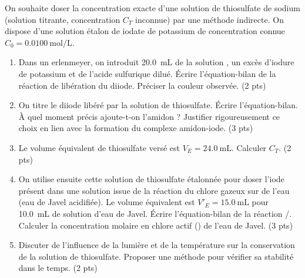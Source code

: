 \documentclass[11pt]{article}
\begin{document}
\begin{exercice}
On souhaite doser la concentration exacte d'une solution de thiosulfate de sodium  (solution titrante, concentration $C_T$ inconnue) par une méthode indirecte. On dispose d'une solution étalon de iodate de potassium  de concentration connue $C_0 = \SI{0,0100}{\mol\per\L}$.
\begin{enumerate}
    \item Dans un erlenmeyer, on introduit \SI{20,0}{\mL} de la solution , un excès d'iodure de potassium  et de l'acide sulfurique dilué. Écrire l'équation-bilan de la réaction de libération du diiode. Préciser la couleur observée. (2 pts)
    \item On titre le diiode libéré par la solution de thiosulfate. Écrire l'équation-bilan. À quel moment précis ajoute-t-on l'amidon ? Justifier rigoureusement ce choix en lien avec la formation du complexe amidon-iode. (3 pts)
    \item Le volume équivalent de thiosulfate versé est $V_E = \SI{24,0}{\mL}$. Calculer $C_T$. (2 pts)
    \item On utilise ensuite cette solution de thiosulfate étalonnée pour doser l'iode présent dans une solution issue de la réaction du chlore gazeux  sur de l'eau (eau de Javel acidifiée). Le volume équivalent est $V'_E = \SI{15,0}{\mL}$ pour \SI{10,0}{\mL} de solution d'eau de Javel. Écrire l'équation-bilan de la réaction /. Calculer la concentration molaire en chlore actif () de l'eau de Javel. (3 pts)
    \item Discuter de l'influence de la lumière et de la température sur la conservation de la solution de thiosulfate. Proposer une méthode pour vérifier sa stabilité dans le temps. (2 pts)
\end{enumerate}
\end{exercice}
\end{document}

